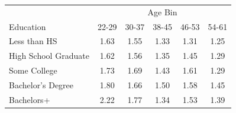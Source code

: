 \begin{tabular}{lccccc}
\hline\hline
 & \multicolumn{5}{c}{Age Bin} \\
Education & 22-29 & 30-37 & 38-45 & 46-53 & 54-61 \\
\hline
Less than HS&1.63&1.55&1.33&1.31&1.25\\
High School Graduate&1.62&1.56&1.35&1.45&1.29\\
Some College&1.73&1.69&1.43&1.61&1.29\\
Bachelor's Degree&1.80&1.66&1.50&1.58&1.45\\
Bachelors+&2.22&1.77&1.34&1.53&1.39\\
\hline\hline
\end{tabular}
